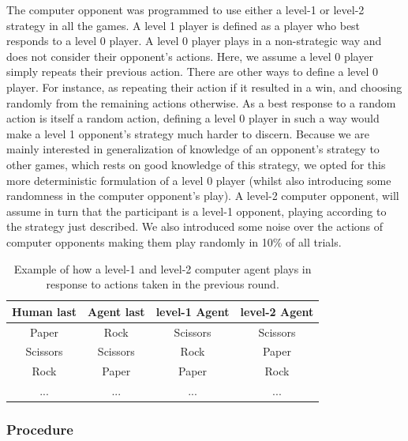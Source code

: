 \documentclass[man,floatsintext]{apa6}
\begin{document}
The computer opponent was programmed to use either a level-1 or level-2 strategy in all the games. A level 1 player is defined as a player who best responds to a level 0 player. A level 0 player plays in a non-strategic way and does not consider their opponent's actions. Here, we assume a level 0 player simply repeats their previous action. There are other ways to define a level 0 player. For instance, as repeating their action if it resulted in a win, and choosing randomly from the remaining actions otherwise. As a best response to a random action is itself a random action, defining a level 0 player in such a way would make a level 1 opponent's strategy much harder to discern. Because we are mainly interested in generalization of knowledge of an opponent's strategy to other games, which rests on good knowledge of this strategy, we opted for this more deterministic formulation of a level 0 player (whilst also introducing some randomness in the computer opponent's play). A level-2 computer opponent, will assume in turn that the participant is a level-1 opponent, playing according to the strategy just described. We also introduced some noise over the actions of computer opponents making them play randomly in 10\% of all trials.

\begin{table}[bth!]
\centering
\begin{tabular}{||c c c c||} 
 \hline
 Human last & Agent last & level-1 Agent & level-2 Agent\\ [0.5ex] 
 \hline\hline
 Paper & Rock & Scissors & Scissors \\ 
 Scissors  & Scissors & Rock & Paper \\
 Rock & Paper & Paper & Rock \\
 ... & ... & ... & ... \\ [1ex] 
 \hline
\end{tabular}
\caption{Example of how a level-1 and level-2 computer agent plays in response to actions taken in the previous round.}
\label{table:1}
\end{table}

\hypertarget{procedure}{%
\subsubsection{Procedure}\label{procedure}}
\end{document}
